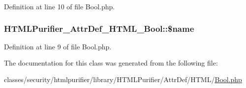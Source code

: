 Definition at line 10 of file Bool.\+php.

\hypertarget{classHTMLPurifier__AttrDef__HTML__Bool_afdbcd84359ce80275e8b8780b7d645ed}{
\subsubsection[{\$name}]{\setlength{\rightskip}{0pt plus 5cm}H\+T\+M\+L\+Purifier\+\_\+\+Attr\+Def\+\_\+\+H\+T\+M\+L\+\_\+\+Bool\+::\$name\hspace{0.3cm}{\ttfamily [protected]}}}\label{classHTMLPurifier__AttrDef__HTML__Bool_afdbcd84359ce80275e8b8780b7d645ed}


Definition at line 9 of file Bool.\+php.



The documentation for this class was generated from the following file\+:\begin{DoxyCompactItemize}
\item 
classes/security/htmlpurifier/library/\+H\+T\+M\+L\+Purifier/\+Attr\+Def/\+H\+T\+M\+L/\hyperlink{Bool_8php}{Bool.\+php}\end{DoxyCompactItemize}
